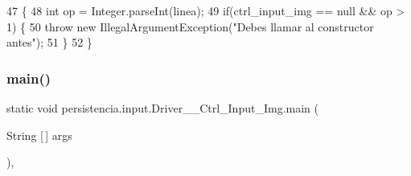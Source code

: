 \begin{DoxyCode}
47                                                                                         \{
48         \textcolor{keywordtype}{int} op = Integer.parseInt(linea);
49         \textcolor{keywordflow}{if}(ctrl\_input\_img == null && op > 1) \{
50             \textcolor{keywordflow}{throw} \textcolor{keyword}{new} IllegalArgumentException(\textcolor{stringliteral}{"Debes llamar al constructor antes"});
51         \}
52     \}
\end{DoxyCode}
\mbox{\label{classpersistencia_1_1input_1_1Driver____Ctrl__Input__Img_afe531cb182d64111aeead5d061965d8f}} 
\subsubsection{\texorpdfstring{main()}{main()}}
{\footnotesize\ttfamily static void persistencia.\+input.\+Driver\+\_\+\+\_\+\+Ctrl\+\_\+\+Input\+\_\+\+Img.\+main (\begin{DoxyParamCaption}\item[{String \mbox{[}$\,$\mbox{]}}]{args }\end{DoxyParamCaption})\hspace{0.3cm}{\ttfamily [inline]}, {\ttfamily [static]}}


